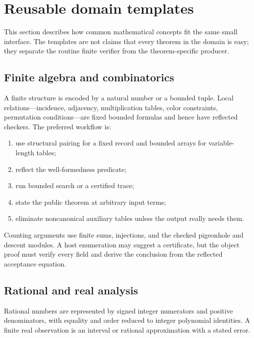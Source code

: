 \section{Reusable domain templates}
\label{sec:templates}

This section describes how common mathematical concepts fit the same small
interface.  The templates are not claims that every theorem in the domain is
easy; they separate the routine finite verifier from the theorem-specific
producer.

\subsection{Finite algebra and combinatorics}

A finite structure is encoded by a natural number or a bounded tuple.  Local
relations---incidence, adjacency, multiplication tables, color constraints,
permutation conditions---are fixed bounded formulas and hence have reflected
checkers.  The preferred workflow is:

\begin{enumerate}[label=(\arabic*)]
\item use structural pairing for a fixed record and bounded arrays for
  variable-length tables;
\item reflect the well-formedness predicate;
\item run bounded search or a certified trace;
\item state the public theorem at arbitrary input terms;
\item eliminate noncanonical auxiliary tables unless the output really needs
  them.
\end{enumerate}

Counting arguments use finite sums, injections, and the checked pigeonhole and
descent modules.  A host enumeration may suggest a certificate, but the object
proof must verify every field and derive the conclusion from the reflected
acceptance equation.

\subsection{Rational and real analysis}

Rational numbers are represented by signed integer numerators and positive
denominators, with equality and order reduced to integer polynomial
identities.  A finite real observation is an interval or rational
approximation with a stated error.

